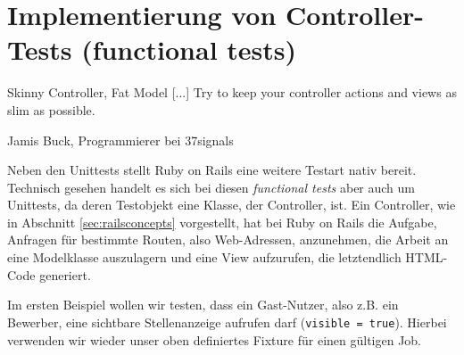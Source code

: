 \section{Implementierung von Controller-Tests (functional tests)}
\epigraph{Skinny Controller, Fat Model [...] Try to keep your controller actions and views as slim as possible.}{Jamis Buck, Programmierer bei 37signals}


Neben den Unittests stellt Ruby on Rails eine weitere Testart nativ bereit. Technisch gesehen handelt es sich bei diesen \textit{functional tests} aber auch um Unittests, da deren Testobjekt eine Klasse, der Controller, ist.
Ein Controller, wie in Abschnitt \ref{sec:railsconcepts} vorgestellt, hat bei Ruby on Rails die Aufgabe, Anfragen für bestimmte Routen, also Web-Adressen, anzunehmen, die Arbeit an eine Modelklasse auszulagern und eine View aufzurufen, die letztendlich HTML-Code generiert.

Im ersten Beispiel wollen wir testen, dass ein Gast-Nutzer, also z.B. ein Bewerber, eine sichtbare Stellenanzeige aufrufen darf (\texttt{visible = true}). Hierbei verwenden wir wieder unser oben definiertes Fixture für einen gültigen Job.
%
%
%
%
\begin{ruby}[label=test/functional/jobs\_controller\_test.rb]
 

   
    
    \PY{o}{[}\PY{o}{]}  
      

        

     
      
\end{ruby}

